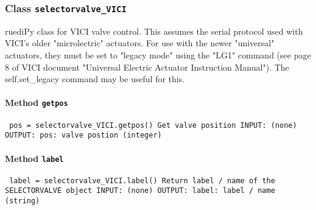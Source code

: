 \subsubsection{Class \texttt{selectorvalve_VICI}}
\par
ruediPy class for VICI valve control. This assumes the serial protocol used with VICI's older "microlectric" actuators. For use with the newer "universal" actuators, they must be set to "legacy mode" using the "LG1" command (see page 8 of VICI document "Universal Electric Actuator Instruction Manual"). The self.set_legacy command may be useful for this.\par

\paragraph{Method \texttt{getpos}}
\vspace{1ex}
\texttt{\newline
pos = selectorvalve_VICI.getpos()\newline
\newline
Get valve position\newline
\newline
INPUT:\newline
(none)\newline
\newline
OUTPUT:\newline
pos: valve postion (integer)\newline
\newline
}

\paragraph{Method \texttt{label}}
\vspace{1ex}
\texttt{\newline
label = selectorvalve_VICI.label()\newline
\newline
Return label / name of the SELECTORVALVE object\newline
\newline
INPUT:\newline
(none)\newline
\newline
OUTPUT:\newline
label: label / name (string)\newline
\newline
}

